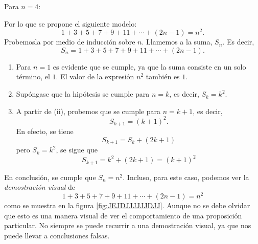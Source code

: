 \begin{Problem}
{\begin{center}
    \end{center}
    Para $n=4$:
    \begin{center}
    \end{center}
    \label{fig:JEJDJJJJJJDJJ}
    }

    \noindent Por lo que se propone el siguiente modelo:
    $$1+3+5+7+9+11+\cdots +(2n-1)=n^2.$$
    Probemosla por medio de inducción sobre $n$. Llamemos a la suma, $S_n$. Es decir,
    $$S_n=1+3+5+7+9+11+\cdots +(2n-1).$$
    \begin{enumerate}[label=\roman*.]
        \item Para $n=1$ es evidente que se cumple, ya que la suma consiste en un solo término, el $1$. El valor de la expresión $n^2$ también es $1$.
        \item Supóngase que la hipótesis se cumple para $n=k$, es decir, $S_k=k^2$.
        \item A partir de (ii), probemos que se cumple para $n=k+1$, es decir,
        $$S_{k+1}=(k+1)^2.$$
        En efecto, se tiene
        $$S_{k+1}=S_k+(2k+1)$$
        pero $S_k=k^2$, se sigue que
        $$S_{k+1}=k^2+(2k+1)=(k+1)^2$$
    \end{enumerate}
    En conclusión, se cumple que $S_n=n^2$. Incluso, para este caso, podemos ver la \emph{demostración visual} de
    $$1+3+5+7+9+11+\cdots +(2n-1)=n^2$$
    como se muestra en la figura \ref{fig:JEJDJJJJJJDJJ}. Aunque no se debe olvidar que esto es una manera visual de ver el comportamiento de una proposición particular. No siempre se puede recurrir a una demostración visual, ya que nos puede llevar a conclusiones falsas.
\end{Problem}

